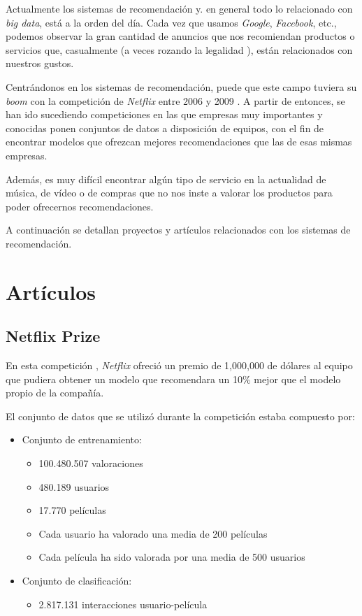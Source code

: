 
Actualmente los sistemas de recomendación y. en general todo lo relacionado con \textit{big data}, está a la orden del día. Cada vez que usamos \textit{Google}, \textit{Facebook}, etc., podemos observar la gran cantidad de anuncios que nos recomiendan productos o servicios que, casualmente (a veces rozando la legalidad \cite{escuchasFacebook}), están relacionados con nuestros gustos.

Centrándonos en los sistemas de recomendación, puede que este campo tuviera su \textit{boom} con la competición de \textit{Netflix} entre 2006 y 2009 \cite{wiki:Netflix_Prize}. A partir de entonces, se han ido sucediendo competiciones en las que empresas muy importantes y conocidas ponen conjuntos de datos a disposición de equipos, con el fin de encontrar modelos que ofrezcan mejores recomendaciones que las de esas mismas empresas.

Además, es muy difícil encontrar algún tipo de servicio en la actualidad de música, de vídeo o de compras que no nos inste a valorar los productos para poder ofrecernos recomendaciones.

A continuación se detallan proyectos y artículos relacionados con los sistemas de recomendación.

\section{Artículos}\label{articulos}
\subsection{Netflix Prize}\label{netflix-prize}
En esta competición \cite{wiki:Netflix_Prize}, \textit{Netflix} ofreció un premio de 1,000,000 de dólares al equipo que pudiera obtener un modelo que recomendara un 10\% mejor que el modelo propio de la compañía.

El conjunto de datos que se utilizó durante la competición estaba compuesto por:
\begin{itemize}
\tightlist
\item Conjunto de entrenamiento:
\begin{itemize}
\tightlist
\item 100.480.507 valoraciones
\item 480.189 usuarios
\item 17.770 películas
\item Cada usuario ha valorado una media de 200 películas
\item Cada película ha sido valorada por una media de 500 usuarios
\end{itemize}
\item Conjunto de clasificación:
\begin{itemize}
\tightlist
\item 2.817.131 interacciones usuario-película
\end{itemize}
\end{itemize}

